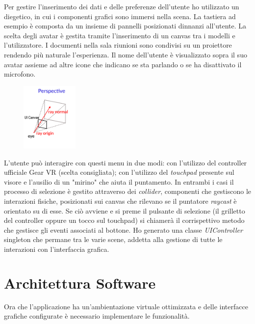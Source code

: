Per gestire l'inserimento dei dati e delle preferenze dell'utente ho utilizzato un  diegetico, in cui i componenti grafici sono immersi nella scena. La tastiera ad esempio è composta da un insieme di pannelli posizionati dinnanzi all'utente. La scelta degli avatar è gestita tramite l'inserimento di un canvas tra i modelli e l'utilizzatore. I documenti nella sala riunioni sono condivisi su un proiettore rendendo più naturale l'esperienza. Il nome dell'utente è visualizzato sopra il suo avatar assieme ad altre icone che indicano se sta parlando o se ha disattivato il microfono.     

\begin{figure} %
	\centering
	\includegraphics[width=0.25\textwidth]{figure/raycast}
	
\end{figure}

L'utente può interagire con questi menu in due modi: con l'utilizzo del controller ufficiale Gear VR (scelta consigliata); con l'utilizzo del \textit{touchpad} presente sul visore e l'ausilio di un "mirino" che aiuta il puntamento. In entrambi i casi il processo di selezione è gestito attraverso dei \textit{collider}, componenti che gestiscono le interazioni fisiche, posizionati sui canvas che rilevano se il puntatore \textit{raycast} è orientato su di esse. Se ciò avviene e si preme il pulsante di selezione (il grilletto del controller oppure un tocco sul touchpad) si chiamerà il corrispettivo metodo che gestisce gli eventi associati al bottone. Ho generato una classe \textit{UIController} singleton che permane tra le varie scene, addetta alla gestione di tutte le interazioni con l'interfaccia grafica.



\section{Architettura Software}
Ora che l'applicazione ha un'ambientazione virtuale ottimizzata e delle interfacce grafiche configurate è necessario implementare le funzionalità.

